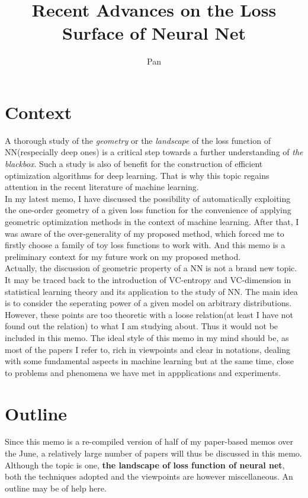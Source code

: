 \documentclass[10pt,a4paper]{article}
\author{Pan}
\title{Recent Advances on the Loss Surface of Neural Net}
\begin{document}
\maketitle
\section{Context}
A thorough study of the \textit{geometry} or the \textit{landscape} of the loss function of NN(respecially deep ones) is a critical step towards a further understanding of \textit{the blackbox}.\cite{open2015} Such a study is also of benefit for the construction of efficient optimization algorithms for deep learning. That is why this topic regains attention in the recent literature of machine learning.
\\
In my latest memo\cite{memo}, I have discussed the possibility of automatically exploiting the one-order geometry of a given loss function for the convenience of applying geometric optimization methods in the context of machine learning. After that, I was aware of the over-generality of my proposed method, which forced me to firstly choose a family of toy loss functions to work with. And this memo is a preliminary context for my future work on my proposed method.   
\\
Actually, the discussion of geometric property of a NN is not a brand new topic. It may be traced back to the introduction of VC-entropy and VC-dimension in statistical learning theory\cite{vapnik2012the} and its application to the study of NN\cite{Anthony2009}. The main idea is to consider the seperating power of a given model on arbitrary distributions. However, these points are too theoretic with a loose relation(at least I have not found out the relation) to what I am studying about. Thus it would not be included in this memo. The ideal style of this memo in my mind should be, as most of the papers I refer to, rich in viewpoints and clear in notations, dealing with some fundamental aspects in machine learning but at the same time, close to problems and phenomena we have met in appplications and experiments.
\section{Outline}
Since this memo is a re-compiled version of half of my paper-based memos over the June, a relatively large number of papers will thus be discussed in this memo. Although the topic is one, \textbf{the landscape of loss function of neural net}, both the techniques adopted and the viewpoints are however miscellaneous. An outline may be of help here.
\end{document}
